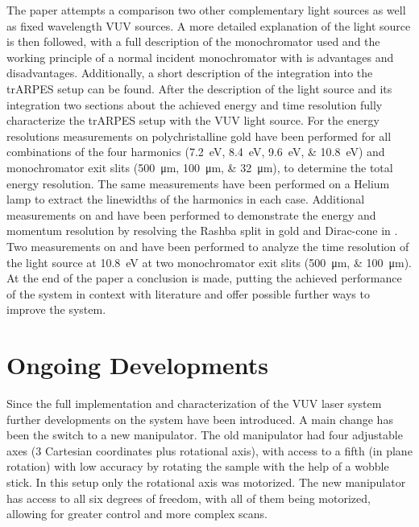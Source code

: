 The paper attempts a comparison two other complementary light sources as well as fixed wavelength VUV sources.
A more detailed explanation of the light source is then followed, with a full description of the monochromator used and the working principle of a normal incident monochromator with is advantages and disadvantages.
Additionally, a short description of the integration into the trARPES setup can be found.
After the description of the light source and its integration two sections about the achieved energy and time resolution fully characterize the trARPES setup with the VUV light source.
For the energy resolutions measurements on polychristalline gold have been performed for all combinations of the four harmonics (\qtylist{7.2;8.4;9.6;10.8}{\electronvolt}) and monochromator exit slits (\qtylist{500;100;32}{\micro\meter}), to determine the total energy resolution.
The same measurements have been performed on a Helium lamp to extract the linewidths of the harmonics in each case.
Additional measurements on  and  have been performed to demonstrate the energy and momentum resolution by resolving the Rashba split in gold and Dirac-cone in .
Two measurements on  and  have been performed to analyze the time resolution of the light source at \qty{10.8}{\electronvolt} at two monochromator exit slits (\qtylist{500;100}{\micro\meter}).
At the end of the paper a conclusion is made, putting the achieved performance of the system in context with literature and offer possible further ways to improve the system.



\section{Ongoing Developments}

Since the full implementation and characterization of the VUV laser system further developments on the system have been introduced.
A main change has been the switch to a new manipulator.
The old manipulator had four adjustable axes (3 Cartesian coordinates plus rotational axis), with access to a fifth (in plane rotation) with low accuracy by rotating the sample with the help of a wobble stick.
In this setup only the rotational axis was motorized.
The new manipulator has access to all six degrees of freedom, with all of them being motorized, allowing for greater control and more complex scans.

